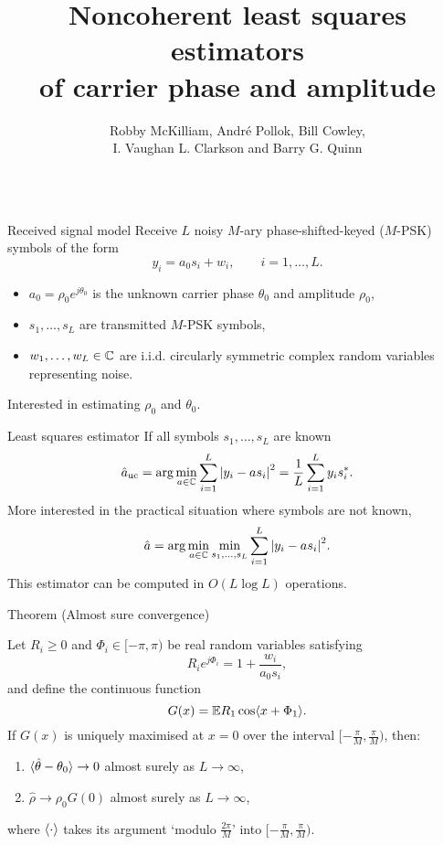 \documentclass[final,hyperref={pdfpagelabels=false}]{beamer}
\title[]{Noncoherent least squares estimators \\ of carrier phase and amplitude}
\author{Robby McKilliam, Andr\'{e} Pollok, Bill Cowley, \\ I. Vaughan L. Clarkson and Barry G. Quinn}
\begin{document}


\begin{columns}[t] %
\begin{column}{.49\textwidth} %

\newcommand{\calC}{{\mathcal C}}
\begin{block}{Received signal model}
Receive $L$ noisy $M$-ary phase-shifted-keyed ($M$-PSK) symbols of the form
\[
y_i = a_0 s_i + w_i, \qquad i = 1, \dots, L.
\]
\begin{itemize}
\item $a_0 = \rho_0 e^{j\theta_0}$ is the unknown carrier phase $\theta_0$ and amplitude $\rho_0$,
\item $s_1,\dots,s_L$ are transmitted $M$-PSK symbols,
\item $w_1,\dots,w_L \in {\mathbb C}$ are i.i.d. circularly symmetric complex random variables representing noise.
\end{itemize}

Interested in estimating $\rho_0$ and $\theta_0$.
\end{block}  

\begin{block}{Least squares estimator}
If all symbols $s_1,\dots,s_L$ are known
\[
\hat{a}_{\text{uc}} = \arg \min_{a \in {\mathbb C}} \sum_{i = 1}^L {\left\vert  y_i - a s_i  \right\vert}^2  = \frac{1}{L} \sum_{i = 1}^L y_i s_i^*.
\]
More interested in the practical situation where symbols are not known,
\[
\hat{a} = \arg\min_{a \in {\mathbb C}} \min_{s_1, \dots, s_L} \sum_{i = 1}^L {\left\vert  y_i - a s_i  \right\vert}^2.
\]
This estimator can be computed in $O(L\log L)$ operations.
\end{block}  


\begin{block}{Theorem (Almost sure convergence)}

Let $R_i \geq 0$ and $\Phi_i \in [-\pi,\pi)$ be real random variables satisfying
\vspace{-0.15cm}
\[
R_ie^{j\Phi_i} = 1 + \frac{w_i}{a_0 s_i},
\]
and define the continuous function
\[
G(x) = {\mathbb E} R_1 \cos\langle  x + \Phi_1 \rangle.
\] 
If $G(x)$ is uniquely maximised at $x = 0$ over the interval $[-\tfrac{\pi}{M},\tfrac{\pi}{M})$, then:
\begin{enumerate}
\item \vspace{-0.15cm} $\langle \hat{\theta} - \theta_0 \rangle \rightarrow 0$ almost surely as $L \rightarrow \infty$,
\item \vspace{-0.2cm} $\hat{\rho} \rightarrow \rho_0 G(0)$ almost surely as $L \rightarrow \infty$,
\end{enumerate}
where $\langle \cdot \rangle$ takes its argument `modulo $\tfrac{2\pi}{M}$' into $[-\tfrac{\pi}{M},\tfrac{\pi}{M})$.
\end{block}


\end{column}
\end{columns}
\end{document}
